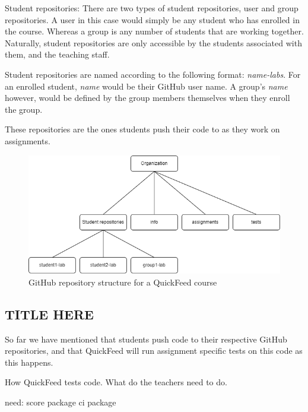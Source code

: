 Student repositories: There are two types of student repositories, user and group repositories.
A user in this case would simply be any student who has enrolled in the course.
Whereas a group is any number of students that are working together.
Naturally, student repositories are only accessible by the students associated with them, and the teaching staff.

Student repositories are named according to the following format: \textit{name-labs}.
For an enrolled student, \textit{name} would be their GitHub user name.
A group's \textit{name} however, would be defined by the group members themselves when they enroll the group.

These repositories are the ones students push their code to as they work on assignments.

\begin{figure}[ht]
    \centering
    \includegraphics[width=\textwidth]{photos/qf-repository-structure.png}
    \caption{GitHub repository structure for a QuickFeed course}
    \label{fig:qf-repository-structure}
\end{figure}

\subsection{TITLE HERE}

So far we have mentioned that students push code to their respective GitHub repositories, and that QuickFeed will run assignment specific tests on this code as this happens.


How QuickFeed tests code.
What do the teachers need to do.

need:
score package
ci package

